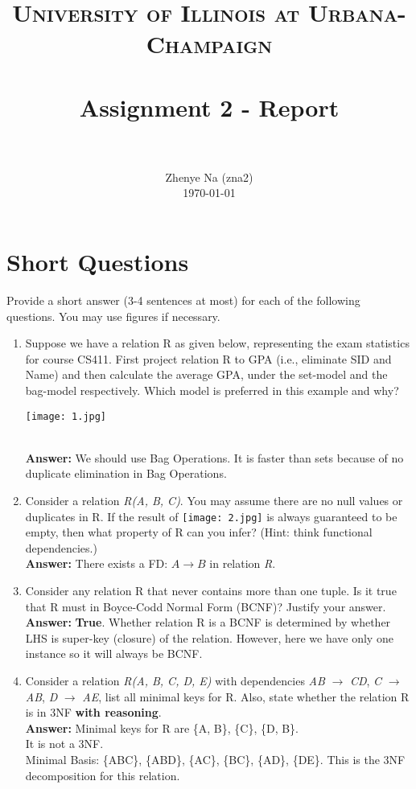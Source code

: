 \documentclass[paper=a4, fontsize=11pt]{scrartcl}
\title{
		\usefont{OT1}{bch}{b}{n}
		\normalfont \normalsize \textsc{University of Illinois at Urbana-Champaign} \\ [25pt]
		\horrule{0.5pt} \\[0.4cm]
		\huge Assignment 2 - Report \\
		\horrule{2pt} \\[0.5cm]
}
\author{
		\normalfont 								\normalsize
        Zhenye Na (zna2)\\[-3pt]		\normalsize
        \today
}
\date{}
\numberwithin{equation}{section}		%
\numberwithin{figure}{section}			%
\numberwithin{table}{section}				%
\begin{document}
\maketitle

\section{Short Questions}
Provide a short answer (3-4 sentences at most) for each of the following questions. You may use figures if necessary.

\begin{enumerate}
	\item Suppose we have a relation R as given below, representing the exam statistics for course CS411. First project relation R to GPA (i.e., eliminate SID and Name) and then calculate the average GPA, under the set-model and the bag-model respectively. Which model is preferred in this example and why?\\
	\centerline{\texttt{[image: 1.jpg]}}\\
    \textbf{Answer:} We should use Bag Operations. It is faster than sets because of no duplicate elimination in Bag Operations.
    
	\item Consider a relation \textit{R(A, B, C)}. You may assume there are no null values or duplicates in R. If the result of \texttt{[image: 2.jpg]} is always guaranteed to be empty, then what property of R can you infer? (Hint: think functional dependencies.)\\
	\textbf{Answer:} There exists a FD: $A \rightarrow B$ in relation \textit{R}.
    
	\item Consider any relation R that never contains more than one tuple. Is it true that R must in Boyce-Codd Normal Form (BCNF)? Justify your answer.\\
    \textbf{Answer:} \textbf{True}. Whether relation R is a BCNF is determined by whether LHS is super-key (closure) of the relation. However, here we have only one instance so it will always be BCNF.
    
	\item Consider a relation \textit{R(A, B, C, D, E)} with dependencies \textit{AB} $\rightarrow$ \textit{CD}, \textit{C} $\rightarrow$ \textit{AB}, \textit{D} $\rightarrow$ \textit{AE}, list all minimal keys for R. Also, state whether the relation R is in 3NF \textbf{with reasoning}.\\
    \textbf{Answer:} Minimal keys for R are \big\{A, B\big\}, \big\{C\big\}, \big\{D, B\big\}.\\
    It is not a 3NF.\\
    Minimal Basis: \big\{ABC\big\}, \big\{ABD\big\}, \big\{AC\big\}, \big\{BC\big\}, \big\{AD\big\}, \big\{DE\big\}. This is the 3NF decomposition for this relation.
    

\end{enumerate}
\end{document}
